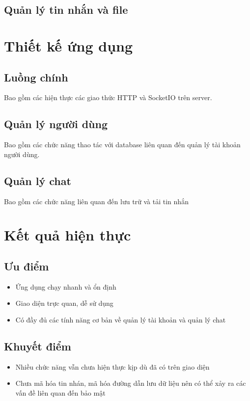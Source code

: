 \documentclass[a4paper]{article}
\begin{document}
	\subsection{Quản lý tin nhắn và file}
\section{Thiết kế ứng dụng}
	\subsection{Luồng chính}
		Bao gồm các hiện thực các giao thức HTTP và SocketIO trên server.
		
	\subsection{Quản lý người dùng}
		Bao gồm các chức năng thao tác với database liên quan đến quản lý tài khoản người dùng. 
		
	\subsection{Quản lý chat}
		Bao gồm các chức năng liên quan đến lưu trữ và tải tin nhắn
		
\section{Kết quả hiện thực}
	\subsection{Ưu điểm}
		\begin{itemize}
			\item Ứng dụng chạy nhanh và ổn định
			\item Giao diện trực quan, dễ sử dụng
			\item Có đầy đủ các tính năng cơ bản về quản lý tài khoản và quản lý chat
		\end{itemize}
		
	\subsection{Khuyết điểm}
		\begin{itemize}
			\item Nhiều chức năng vẫn chưa hiện thực kịp dù đã có trên giao diện
			\item Chưa mã hóa tin nhán, mã hóa đường dẫn lưu dữ liệu nên có thể xảy ra các vấn đề liên quan đến bảo mật
		\end{itemize}
		
\end{document}
